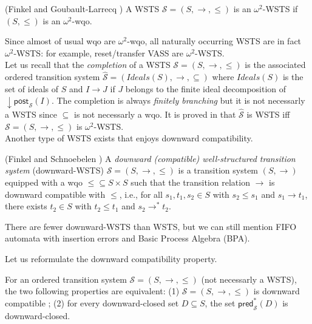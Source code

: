 \documentclass[runningheads]{llncs}
\newcommand{\pred}{\textsf{pred}}
\newcommand{\post}{\textsf{post}}
\begin{document}
\begin{definition}(Finkel and Goubault-Larrecq \cite{DBLP:journals/corr/abs-1208-4549})
A WSTS  $\mathscr{S}=(S, \rightarrow, \leq)$
is an $\omega^2$-WSTS if $(S, \leq)$ is an $\omega^2$-wqo.
\end{definition}
Since almost of usual wqo are $\omega^2$-wqo, all naturally occurring WSTS are in fact $\omega^2$-WSTS: for example, reset/transfer VASS are $\omega^2$-WSTS.\\

Let us recall that the \emph{completion}  \cite{BFM-ic17} of a WSTS $\mathscr{S}=(S,\rightarrow, \leq)$ is the associated ordered transition system $\hat{\mathscr{S}}=(Ideals(S),\rightarrow, \subseteq)$ where $Ideals(S)$ is the set of ideals of $S$ and $I \rightarrow J$ if $J$ belongs to the finite ideal decomposition of $\mathop{\downarrow} \post_{\mathscr{S}}(I)$. The completion is always \emph{finitely branching} but it is not necessarly a WSTS since $\subseteq$ is not necessarly a wqo. It is proved in  \cite{BFM-ic17} that $\hat{\mathscr{S}}$ is WSTS iff $\mathscr{S}=(S,\rightarrow, \leq)$ is $\omega^2$-WSTS. \\

Another type of WSTS exists that enjoys downward compatibility.

\begin{definition}(Finkel and Schnoebelen \cite{DBLP:journals/tcs/FinkelS01})
A {\em downward (compatible) well-structured transition system} (downward-WSTS)  $\mathscr{S}=(S, \rightarrow, \leq)$
is a transition system $(S, \rightarrow)$
equipped with a wqo ${\leq} \subseteq S \times S$ such that   
the transition relation $ \rightarrow$ is downward compatible with $\leq$, i.e., for all 
$s_1, t_1 , s_2 \in S$
	with $s_2 \leq s_1$  and $s_1 \rightarrow t_1$, there exists 
	$t_2 \in S$ with 
	$t_2 \leq t_1$ and $s_2 \rightarrow^{*} t_2$.
\end{definition}

There are fewer downward-WSTS than WSTS, but we can still mention FIFO automata with insertion errors and Basic Process Algebra (BPA).

Let us reformulate the downward compatibility property.

\begin{lemma}\label{downward compatible}
For an ordered transition system $\mathscr{S}=(S, \rightarrow, \leq)$ (not necessarly a WSTS), the two following properties are equivalent: (1) $\mathscr{S}=(S, \rightarrow, \leq)$ is downward compatible ; (2) for every downward-closed set $D \subseteq S$, the set $\pred_{\mathscr{S}}^*(D)$ is downward-closed.
\end{lemma}
\end{document}
